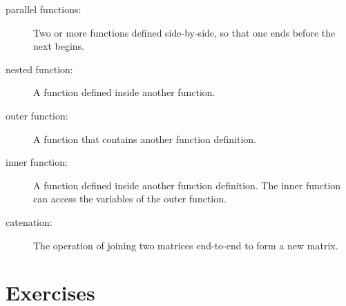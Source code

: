 \documentclass{book}
\begin{document}
\begin{description}

\item[parallel functions:] Two or more functions defined side-by-side,
so that one ends before the next begins.

\item[nested function:] A function defined inside another function.

\item[outer function:] A function that contains another function
definition.

\item[inner function:] A function defined inside another function
definition. The inner function can access the variables of the
outer function.

\item[catenation:] The operation of joining two matrices end-to-end to
form a new matrix.


\end{description}

\section{Exercises}
\end{document}

